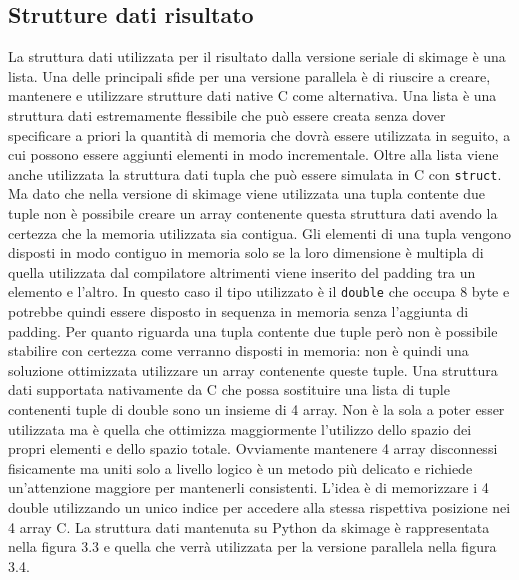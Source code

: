 \documentclass[12pt,a4paper]{report}
\begin{document}
\subsection{Strutture dati risultato}
La struttura dati utilizzata per il risultato dalla versione seriale di skimage è una lista. Una delle principali sfide per una versione parallela è di riuscire a creare, mantenere e utilizzare strutture dati native C come alternativa. 
Una lista è una struttura dati estremamente flessibile che può essere creata senza dover specificare a priori la quantità di memoria che dovrà essere utilizzata in seguito, a cui possono essere aggiunti elementi in modo incrementale. 
Oltre alla lista viene anche utilizzata la struttura dati tupla che può essere simulata in C con \verb|struct|. Ma dato che nella versione di skimage viene utilizzata una tupla contente due tuple non è possibile creare un array contenente questa struttura dati avendo la certezza che la memoria utilizzata sia contigua. Gli elementi di una tupla vengono disposti in modo contiguo in memoria solo se la loro dimensione è multipla di quella utilizzata dal compilatore altrimenti viene inserito del padding tra un elemento e l'altro. In questo caso il tipo utilizzato è il \verb|double| che occupa 8 byte e potrebbe quindi essere disposto in sequenza in memoria senza l'aggiunta di padding. Per quanto riguarda una tupla contente due tuple però non è possibile stabilire con certezza come verranno disposti in memoria: non è quindi una soluzione ottimizzata utilizzare un array contenente queste tuple. \newline
Una struttura dati supportata nativamente da C che possa sostituire una lista di tuple contenenti tuple di double sono un insieme di 4 array. Non è la sola a poter esser utilizzata ma è quella che ottimizza maggiormente l'utilizzo dello spazio dei propri elementi e dello spazio totale. Ovviamente mantenere 4 array disconnessi fisicamente ma uniti solo a livello logico è un metodo più delicato e richiede un'attenzione maggiore per mantenerli consistenti. L'idea è di memorizzare i 4 double utilizzando un unico indice per accedere alla stessa rispettiva posizione nei 4 array C. \newline
La struttura dati mantenuta su Python da skimage è rappresentata nella figura 3.3 e quella che verrà utilizzata per la versione parallela nella figura 3.4. \newline
\end{document}

